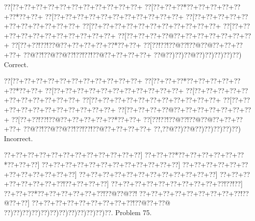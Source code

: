 \documentclass[a5paper]{article}
\begin{document}
\begin{center}
{\goo
\0??[\0??+\0??+\0??+\0??+\0??+\0??+\0??+\0??+\0??+\0??+\0??+
\0??[\0??+\0??+\0??*\0??+\0??+\0??+\0??+\0??+\0??*\0??+\0??+
\0??[\0??+\0??+\0??+\0??+\0??+\0??+\0??+\0??+\0??+\0??+\0??+
\0??[\0??+\0??+\0??+\0??+\0??+\0??+\0??+\0??+\0??+\0??+\0??+
\0??[\0??+\0??+\0??+\0??+\0??+\0??+\0??+\0??+\0??+\0??+\0??+
\0??[\0??+\0??+\0??+\0??+\0??+\0??+\0??+\0??+\0??+\0??+\0??+
\0??[\0??+\0??+\0??+\0??@\0??+\0??+\0??+\0??+\0??+\0??+\0??+
\0??[\0??+\0??!\0??!\0??@\0??+\0??+\0??+\0??+\0??*\0??+\0??+
\0??[\0??!\0??!\0??@\0??!\0??@\0??@\0??+\0??+\0??+\0??+
\0??@\0??!\0??@\0??@\0??!\0??!\0??!\0??@\0??+\0??+\0??+\0??+
\0??@\0??)\0??)\0??@\0??)\0??)\0??)\0??)\0??)
}
Correct. 

\end{center}
\begin{center}
{\goo
\0??[\0??+\0??+\0??+\0??+\0??+\0??+\0??+\0??+\0??+\0??+\0??+
\0??[\0??+\0??+\0??*\0??+\0??+\0??+\0??+\0??+\0??*\0??+\0??+
\0??[\0??+\0??+\0??+\0??+\0??+\0??+\0??+\0??+\0??+\0??+\0??+
\0??[\0??+\0??+\0??+\0??+\0??+\0??+\0??+\0??+\0??+\0??+\0??+
\0??[\0??+\0??+\0??+\0??+\0??+\0??+\0??+\0??+\0??+\0??+\0??+
\0??[\0??+\0??+\0??+\0??+\0??+\0??+\0??+\0??+\0??+\0??+\0??+
\0??[\0??+\0??+\0??+\0??@\0??+\0??+\0??+\0??+\0??+\0??+\0??+
\0??[\0??+\0??!\0??!\0??@\0??+\0??+\0??+\0??+\0??*\0??+\0??+
\0??[\0??!\0??!\0??@\0??!\0??@\0??@\0??+\0??+\0??+\0??+
\0??@\0??!\0??@\0??@\0??!\0??!\0??!\0??@\0??+\0??+\0??+\0??+
\0??,\0??@\0??)\0??@\0??)\0??)\0??)\0??)\0??)
}
Incorrect. 

\end{center}
\newpage
\begin{center}
{\goo
\0??+\0??+\0??+\0??+\0??+\0??+\0??+\0??+\0??+\0??+\0??+\0??]
\0??+\0??+\0??*\0??+\0??+\0??+\0??+\0??+\0??*\0??+\0??+\0??]
\0??+\0??+\0??+\0??+\0??+\0??+\0??+\0??+\0??+\0??+\0??+\0??]
\0??+\0??+\0??+\0??+\0??+\0??+\0??+\0??+\0??+\0??+\0??+\0??]
\0??+\0??+\0??+\0??+\0??+\0??+\0??+\0??+\0??+\0??+\0??+\0??]
\0??+\0??+\0??+\0??+\0??+\0??+\0??+\0??!\0??+\0??+\0??+\0??]
\0??+\0??+\0??+\0??+\0??+\0??+\0??+\0??+\0??+\0??!\0??!\0??]
\0??+\0??+\0??*\0??+\0??+\0??+\0??+\0??+\0??!\0??@\0??@\0??!
\0??+\0??+\0??+\0??+\0??+\0??+\0??+\0??+\0??!\0??@\0??+\0??]
\0??+\0??+\0??+\0??+\0??+\0??+\0??+\0??+\0??!\0??@\0??+\0??@
\0??)\0??)\0??)\0??)\0??)\0??)\0??)\0??)\0??)\0??)\0??)\0??.
}
Problem 75.

\end{center}
\end{document}
